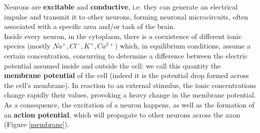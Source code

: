 \documentclass[12pt, a4paper]{report}
\begin{document}
	Neurons are \textbf{excitable} and \textbf{conductive}, i.e. they can generate an electrical impulse and transmit it to other neurons, forming neuronal microcircuits, often associated with a specific area and/or task of the brain. \\
	Inside every neuron, in the cytoplasm, there is a coexistence of different ionic species (mostly $Na^+, Cl^-, K^+, Ca^{2+}$) which, in equilibrium conditions, assume a certain concentration, concurring to determine a difference between the electric potential assumed inside and outside the cell: we call this quantity the \textbf{membrane potential} of the cell (indeed it is the potential drop formed across the cell's membrane).  In reaction to an external stimulus, the ionic concentrations change rapidly their values, provoking a heavy change in the membrane potential. As a consequence, the excitation of a neuron happens, as well as the formation of an \textbf{action potential}, which will propagate to other neurons across the axon (Figure \ref{membrane}). 
\end{document}
